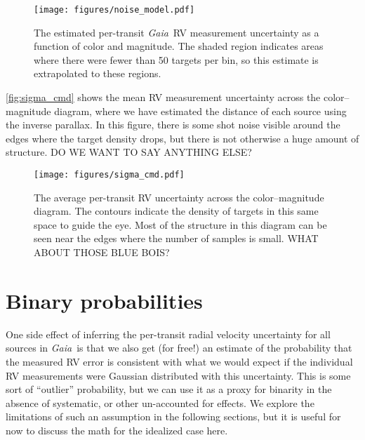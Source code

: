 \documentclass[modern, letterpaper]{aastex631}
\newcommand{\project}[1]{\textsl{#1}}
\newcommand{\Gaia}{\project{Gaia}}
\begin{document}
\begin{figure}
	\begin{centering}
		\texttt{[image: figures/noise\_model.pdf]}
		\caption{The estimated per-transit \Gaia\ RV measurement uncertainty as a function of color and magnitude.
			The shaded region indicates areas where there were fewer than 50 targets per bin, so this estimate is extrapolated to these regions.}
		\label{fig:noise_model}
	\end{centering}
\end{figure}

\autoref{fig:sigma_cmd} shows the mean RV measurement uncertainty across the color--magnitude diagram, where we have estimated the distance of each source using the inverse parallax.
In this figure, there is some shot noise visible around the edges where the target density drops, but there is not otherwise a huge amount of structure.
DO WE WANT TO SAY ANYTHING ELSE?

\begin{figure}
	\begin{centering}
		\texttt{[image: figures/sigma\_cmd.pdf]}
		\caption{The average per-transit RV uncertainty across the color--magnitude diagram.
			The contours indicate the density of targets in this same space to guide the eye.
			Most of the structure in this diagram can be seen near the edges where the number of samples is small.
			WHAT ABOUT THOSE BLUE BOIS?}
		\label{fig:sigma_cmd}
	\end{centering}
\end{figure}


\section{Binary probabilities}

One side effect of inferring the per-transit radial velocity uncertainty for all sources in \Gaia\ is that we also get (for free!) an estimate of the probability that the measured RV error is consistent with what we would expect if the individual RV measurements were Gaussian distributed with this uncertainty.
This is some sort of ``outlier'' probability, but we can use it as a proxy for binarity in the absence of systematic, or other un-accounted for effects.
We explore the limitations of such an assumption in the following sections, but it is useful for now to discuss the math for the idealized case here.
\end{document}
